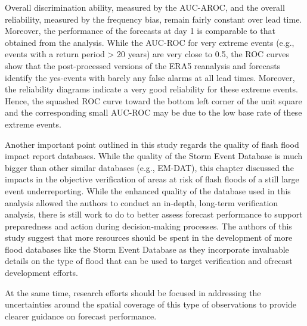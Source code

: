 Overall discrimination ability, measured by the AUC-AROC, and the overall reliability, measured by the frequency bias, remain fairly constant over lead time. Moreover, the performance of the forecasts at day 1 is comparable to that obtained from the analysis. While the AUC-ROC for very extreme events (e.g., events with a return period > 20 years) are very close to 0.5, the ROC curves show that the post-processed versions of the ERA5 reanalysis and forecasts identify the yes-events with barely any false alarms at all lead times. Moreover, the reliability diagrams indicate a very good reliability for these extreme events. Hence, the squashed ROC curve toward the bottom left corner of the unit square and the corresponding small AUC-ROC may be due to the low base rate of these extreme events.

Another important point outlined in this study regards the quality of flash flood impact report databases. While the quality of the Storm Event Database is much bigger than other similar databases (e.g., EM-DAT), this chapter discussed the impacts in the objective verification of areas at risk of flash floods of a still large event underreporting. While the enhanced quality of the database used in this analysis allowed the authors to conduct an in-depth, long-term verification analysis, there is still work to do to better assess forecast performance to support preparedness and action during decision-making processes. The authors of this study suggest that more resources should be spent in the development of more flood databases like the Storm Event Database as they incorporate invaluable details on the type of flood that can be used to target verification and ofrecast development efforts. 

At the same time, research efforts should be focused in addressing the uncertainties around the spatial coverage of this type of observations to provide clearer guidance on forecast performance.